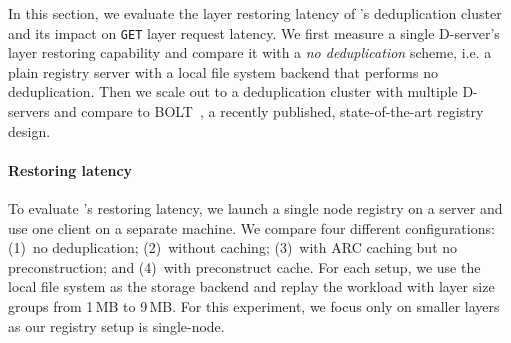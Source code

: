 In this section, we evaluate the layer restoring latency of \sysname's deduplication cluster 
and its impact on \texttt{GET} layer request latency.
%
We first measure a single D-server's layer restoring capability and compare it with 
a \emph{no deduplication} scheme, i.e.  a plain registry server with a local file system backend
that performs no deduplication.
%
Then we scale out to a deduplication cluster with multiple D-servers and compare
\sysname to BOLT~\cite{littley2019bolt}, a recently published, state-of-the-art registry design.
%
%
%

\paragraph{Restoring latency}
%
%
To evaluate \sysname{}'s restoring latency, we launch a single node registry on a server
and use one client on a separate machine.
%
We compare four different configurations:
(1)~no deduplication;
(2)~\sysname without caching;
(3)~\sysname with ARC caching but no preconstruction; and
(4)~\sysname with preconstruct cache.
%
For each setup, we use the local file system as the storage backend and replay the
\dal workload with layer size groups from 1\,MB to 9\,MB. For this experiment, we focus
only on smaller layers as our registry setup is single-node.
%
%

